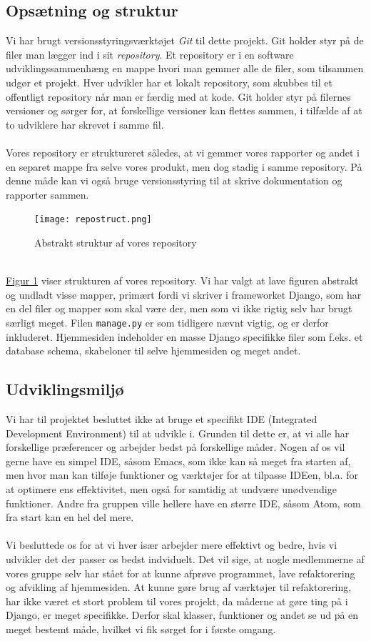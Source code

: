 \documentclass[12pt]{article}
\begin{document}
\subsection{Opsætning og struktur}
Vi har brugt versionsstyringsværktøjet \textit{Git} til dette projekt. Git holder styr på de filer man lægger ind i sit \textit{repository}. Et repository er i en software udviklingssammenhæng en mappe hvori man gemmer alle de filer, som tilsammen udgør et projekt. Hver udvikler har et lokalt repository, som skubbes til et offentligt repository når man er færdig med at kode. Git holder styr på filernes versioner og sørger for, at forskellige versioner kan flettes sammen, i tilfælde af at to udviklere har skrevet i samme fil.\cite{git}\\
\\
Vores repository er struktureret således, at vi gemmer vores rapporter og andet i en separet mappe fra selve vores produkt, men dog stadig i samme repository. På denne måde kan vi også bruge versionsstyring til at skrive dokumentation og rapporter sammen.

\begin{figure}[H]
	\centering
	\texttt{[image: repostruct.png]}
	 \caption{Abstrakt struktur af vores repository}
	 \label{fig:repostruct}
\end{figure}
~\\
\hyperref[fig:repostruct]{Figur \ref*{fig:repostruct}} viser strukturen af vores repository. Vi har valgt at lave figuren abstrakt og undladt visse mapper, primært fordi vi skriver i frameworket Django, som har en del filer og mapper som skal være der, men som vi ikke rigtig selv har brugt særligt meget. Filen \texttt{manage.py} er som tidligere nævnt vigtig, og er derfor inkluderet. Hjemmesiden indeholder en masse Django specifikke filer som f.eks. et database schema, skabeloner til selve hjemmesiden og meget andet.

\subsection{Udviklingsmiljø}
Vi har til projektet besluttet ikke at bruge et specifikt IDE (Integrated Development Environment) til at udvikle i. Grunden til dette er, at vi alle har forskellige præferencer og arbejder bedst på forskellige måder. Nogen af os vil gerne have en simpel IDE, såsom Emacs, som ikke kan så meget fra starten af, men hvor man kan tilføje funktioner og værktøjer for at tilpasse IDEen, bl.a. for at optimere ens effektivitet, men også for samtidig at undvære unødvendige funktioner. Andre fra gruppen ville hellere have en større IDE, såsom Atom, som fra start kan en hel del mere. \\
\\
Vi besluttede os for at vi hver især arbejder mere effektivt og bedre, hvis vi udvikler det der passer os bedst indviduelt. Det vil sige, at nogle medlemmerne af vores gruppe selv har stået for at kunne afprøve programmet, lave refaktorering og afvikling af hjemmesiden. At kunne gøre brug af værktøjer til refaktorering, har ikke været et stort problem til vores projekt, da måderne at gøre ting på i Django, er meget specifikke. Derfor skal klasser, funktioner og andet se ud på en meget bestemt måde, hvilket vi fik sørget for i første omgang.
\end{document}
